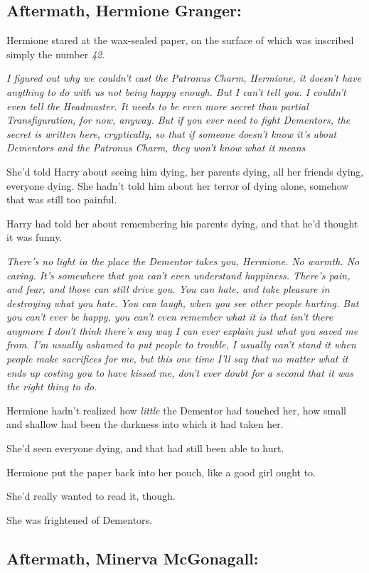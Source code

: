 \subsection{Aftermath, Hermione Granger:}

Hermione stared at the wax-sealed paper, on the surface of which was inscribed
simply the number \emph{42.}

\emph{I figured out why we couldn't cast the Patronus Charm, Hermione, it
doesn't have anything to do with us not being happy enough. But I can't tell
you. I couldn't even tell the Headmaster. It needs to be even more secret than
partial Transfiguration, for now, anyway. But if you ever need to fight
Dementors, the secret is written here, cryptically, so that if someone doesn't
know it's about Dementors and the Patronus Charm, they won't know what it
means{\el}}

She'd told Harry about seeing him dying, her parents dying, all her friends
dying, everyone dying. She hadn't told him about her terror of dying alone,
somehow that was still too painful.

Harry had told her about remembering his parents dying, and that he'd thought
it was funny.

\emph{There's no light in the place the Dementor takes you, Hermione. No
warmth. No caring. It's somewhere that you can't even understand happiness.
There's pain, and fear, and those can still drive you. You can hate, and take
pleasure in destroying what you hate. You can laugh, when you see other people
hurting. But you can't ever be happy, you can't even remember what it is that
isn't there anymore{\el} I don't think there's any way I can ever explain
just what you saved me from. I'm usually ashamed to put people to trouble, I
usually can't stand it when people make sacrifices for me, but this one time
I'll say that no matter what it ends up costing you to have kissed me, don't
ever doubt for a second that it was the right thing to do.}

Hermione hadn't realized how \emph{little} the Dementor had touched her, how
small and shallow had been the darkness into which it had taken her.

She'd seen everyone dying, and that had still been able to hurt.

Hermione put the paper back into her pouch, like a good girl ought to.

She'd really wanted to read it, though.

She was frightened of Dementors.
\sbreak
\subsection{Aftermath, Minerva McGonagall:}

